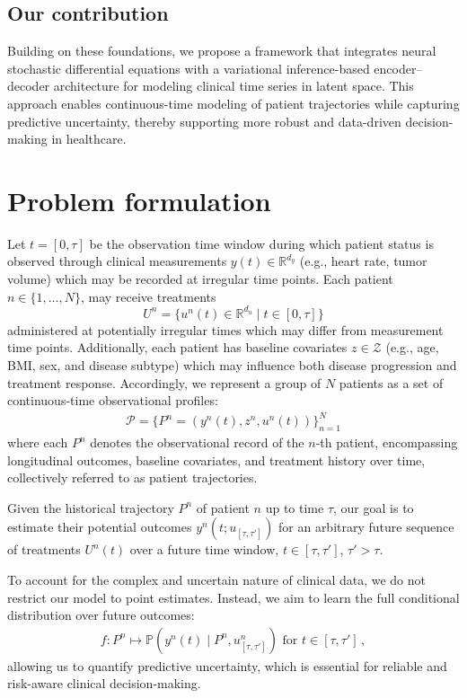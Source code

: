 \documentclass[preprint,12pt]{elsarticle}
\begin{document}
\subsection{Our contribution}
Building on these foundations, we propose a framework that integrates neural stochastic differential equations with a variational inference-based encoder–decoder architecture for modeling clinical time series in latent space. This approach enables continuous-time modeling of patient trajectories while capturing predictive uncertainty, thereby supporting more robust and data-driven decision-making in healthcare.

\section{Problem formulation}
Let $t=[0,\tau]$ be the observation time window during which patient status is observed through clinical measurements $y(t) \in \mathbb{R}^{d_y}$ (e.g., heart rate, tumor volume) which may be recorded at irregular time points. 
Each patient $n \in \{1,\ldots,N\}$, may receive treatments $$U^n= \{u^n(t) \in \mathbb{R}^{d_u} \mid t \in [0,\tau] \}$$ administered at potentially irregular times which may differ from measurement time points. Additionally, each patient has baseline covariates $z \in \mathcal{Z}$ (e.g., age, BMI, sex, and disease subtype) which may influence both disease progression and treatment response. 
Accordingly, we represent a group of $N$ patients as a set of continuous-time observational profiles: 
\begin{align}
    \mathcal{P}= \{P^n=(y^n(t), z^n, u^n(t)) \}_{n=1}^N 
\end{align}
where each $P^n$ denotes the observational record of the $n$-th patient, encompassing longitudinal outcomes, baseline covariates, and treatment history over time, collectively referred to as patient trajectories.

Given the historical trajectory $P^n$ of patient $n$ up to time $\tau$, our goal is to estimate their potential outcomes $y^n(t; u_{[\tau, \tau']})$ for an arbitrary future sequence of treatments $U^n(t)$ over a future time window, $t \in [\tau, \tau']$, $
\tau' > \tau$. 

To account for the complex and uncertain nature of clinical data, we do not restrict our model to point estimates. Instead, we aim to learn the full conditional distribution over future outcomes:
\begin{align}
f: P^n \mapsto \mathbb{P}\left(y^n(t) \mid P^n, u^n_{[\tau, \tau']}\right)  \text{ for } t \in [\tau, \tau']\,,
\end{align}
allowing us to quantify predictive uncertainty, which is essential for reliable and risk-aware clinical decision-making.
\end{document}
